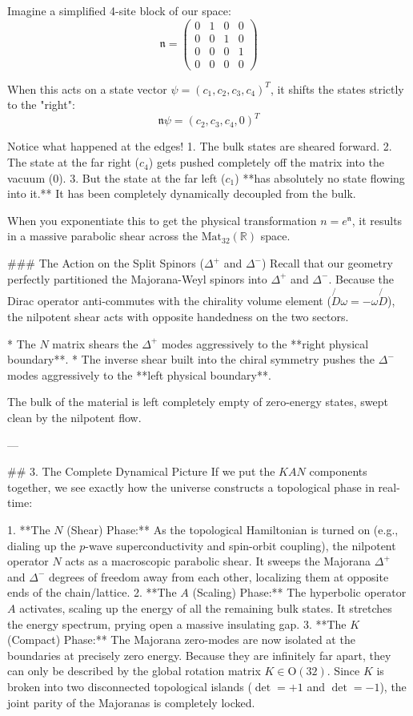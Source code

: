 Imagine a simplified 4-site block of our space:
$$ \mathfrak{n} = \begin{pmatrix} 0 & 1 & 0 & 0 \\ 0 & 0 & 1 & 0 \\ 0 & 0 & 0 & 1 \\ 0 & 0 & 0 & 0 \end{pmatrix} $$

When this acts on a state vector $\psi = (c_1, c_2, c_3, c_4)^T$, it shifts the states strictly to the "right":
$$ \mathfrak{n} \psi = (c_2, c_3, c_4, 0)^T $$

Notice what happened at the edges! 
1. The bulk states are sheared forward.
2. The state at the far right ($c_4$) gets pushed completely off the matrix into the vacuum ($0$). 
3. But the state at the far left ($c_1$) **has absolutely no state flowing into it.** It has been completely dynamically decoupled from the bulk. 

When you exponentiate this to get the physical transformation $n = e^\mathfrak{n}$, it results in a massive parabolic shear across the $\text{Mat}_{32}(\mathbb{R})$ space. 

### The Action on the Split Spinors ($\Delta^+$ and $\Delta^-$)
Recall that our geometry perfectly partitioned the Majorana-Weyl spinors into $\Delta^+$ and $\Delta^-$. 
Because the Dirac operator anti-commutes with the chirality volume element ($\not{D}\omega = -\omega\not{D}$), the nilpotent shear acts with opposite handedness on the two sectors. 

* The $N$ matrix shears the $\Delta^+$ modes aggressively to the **right physical boundary**.
* The inverse shear built into the chiral symmetry pushes the $\Delta^-$ modes aggressively to the **left physical boundary**.

The bulk of the material is left completely empty of zero-energy states, swept clean by the nilpotent flow.

---

## 3. The Complete Dynamical Picture
If we put the $K A N$ components together, we see exactly how the universe constructs a topological phase in real-time:

1. **The $N$ (Shear) Phase:** As the topological Hamiltonian is turned on (e.g., dialing up the $p$-wave superconductivity and spin-orbit coupling), the nilpotent operator $N$ acts as a macroscopic parabolic shear. It sweeps the Majorana $\Delta^+$ and $\Delta^-$ degrees of freedom away from each other, localizing them at opposite ends of the chain/lattice.
2. **The $A$ (Scaling) Phase:** The hyperbolic operator $A$ activates, scaling up the energy of all the remaining bulk states. It stretches the energy spectrum, prying open a massive insulating gap. 
3. **The $K$ (Compact) Phase:** The Majorana zero-modes are now isolated at the boundaries at precisely zero energy. Because they are infinitely far apart, they can only be described by the global rotation matrix $K \in \text{O}(32)$. Since $K$ is broken into two disconnected topological islands ($\det = +1$ and $\det = -1$), the joint parity of the Majoranas is completely locked. 

